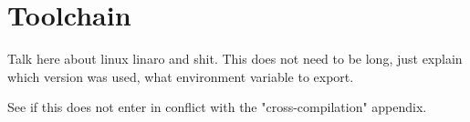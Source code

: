 \chapter{Toolchain}

Talk here about linux linaro and shit.
This does not need to be long, just explain which version was used, what environment variable to export.

See if this does not enter in conflict with the "cross-compilation" appendix.